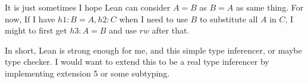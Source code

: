 \documentclass[conference]{IEEEtran}
\begin{document}
It is just sometimes I hope Lean can consider $A=B$ as $B=A$ as same thing. For now, If I have $h1:B=A,h2:C$ when I need to use $B$ to substitute all $A$ in $C$, I might to first get $h3:A=B$ and use $rw$ after that.

In short, Lean is strong enough for me, and this simple type inferencer, or maybe type checker. I would want to extend this to be a real type inferencer by implementing extension 5 or some subtyping.

{}
\end{document}
